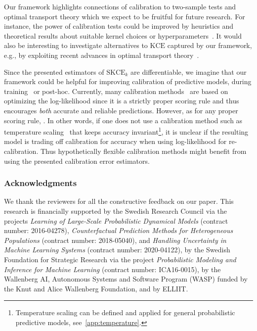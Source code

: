 \documentclass{article}
\begin{document}
Our framework highlights connections of calibration to two-sample
tests and optimal transport theory which we expect
to be fruitful for future research. For instance, the power of calibration
tests could be improved by heuristics and theoretical results about
suitable kernel choices or hyperparameters~\citep[cf.][]{Jitkrittum2016}.
It would also be interesting to investigate alternatives to $\mathrm{KCE}$
captured by our framework, e.g., by exploiting recent advances in
optimal transport theory~\citep[cf.][]{Genevay2016}.

Since the presented estimators of $\mathrm{SKCE}_k$ are differentiable, we
imagine that our framework could be helpful for improving calibration of
predictive models, during training~\citep[cf.][]{Kumar2018} or post-hoc.
Currently, many calibration
methods~\citep[see, e.g.,][]{Guo2017,Kull2019,Song2019} are based on
optimizing the log-likelihood since it is a strictly proper scoring rule and
thus encourages \emph{both} accurate and reliable predictions. However, as
for any proper scoring rule, . In other words, if one does not
use a calibration method such as temperature scaling~\citep{Guo2017} that
keeps accuracy invariant\footnote{Temperature scaling can be defined
and applied for general probabilistic predictive models, see~\cref{app:temperature}.},
it is unclear if the resulting model is
trading off calibration for accuracy when using log-likelihood for
re-calibration. Thus hypothetically flexible calibration methods might
benefit from using the presented calibration error estimators.

\subsubsection*{Acknowledgments}

We thank the reviewers for all the constructive feedback on our paper.
This research is financially supported by the Swedish Research Council via the
projects \emph{Learning of Large-Scale Probabilistic Dynamical Models} (contract
number: 2016-04278), \emph{Counterfactual Prediction Methods for Heterogeneous
Populations} (contract number: 2018-05040), and
\emph{Handling Uncertainty in Machine Learning Systems} (contract number: 2020-04122),
by the Swedish Foundation for Strategic Research via the project
\emph{Probabilistic Modeling and Inference for Machine Learning} (contract number: ICA16-0015),
by the Wallenberg AI, Autonomous Systems and Software Program (WASP) funded by the Knut and Alice
Wallenberg Foundation, and by ELLIIT.
\end{document}
